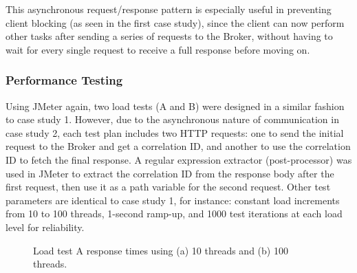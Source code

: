 This asynchronous request/response pattern is especially useful in preventing client blocking (as seen in the first case study), since the client can now perform other tasks after sending a series of requests to the Broker, without having to wait for every single request to receive a full response before moving on.


\subsubsection{Performance Testing}

Using JMeter again, two load tests (A and B) were designed in a similar fashion to case study 1. However, due to the asynchronous nature of communication in case study 2, each test plan includes two HTTP requests: one to send the initial request to the Broker and get a correlation ID, and another to use the correlation ID to fetch the final response. A regular expression extractor (post-processor) was used in JMeter to extract the correlation ID from the response body after the first request, then use it as a path variable for the second request. Other test parameters are identical to case study 1, for instance: constant load increments from 10 to 100 threads, 1-second ramp-up, and 1000 test iterations at each load level for reliability.

\begin{figure}[H]
  \centering
  \caption{Load test A response times using (a) 10 threads and (b) 100 threads.}
  \label{fig:cs02-lta-12}
\end{figure}

